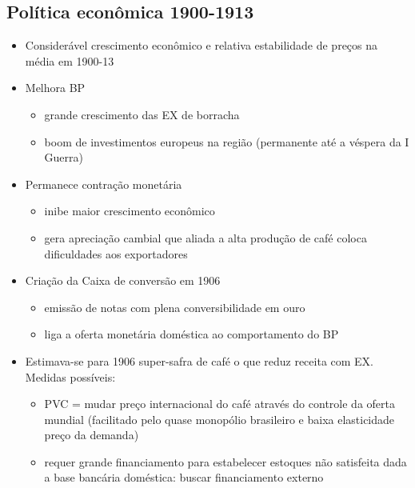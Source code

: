 \documentclass[a4paper,12pt]{article}[abntex2]
\begin{document}
\subsection{\textbf{Política econômica 1900-1913}}
\begin{itemize}
    \item Considerável crescimento econômico e relativa estabilidade de preços na média em 1900-13
    \item Melhora BP
    \begin{itemize}
        \item  grande crescimento das EX de borracha
    \end{itemize}
    \begin{itemize}
        \item boom de investimentos europeus na região (permanente até a véspera da I Guerra)
    \end{itemize}
    \item Permanece contração monetária
    \begin{itemize}
        \item inibe maior crescimento econômico
    \end{itemize}
    \begin{itemize}
        \item gera apreciação cambial que aliada a alta produção de café coloca dificuldades aos exportadores
    \end{itemize}
\item Criação da Caixa de conversão em 1906
\begin{itemize}
    \item  emissão de notas com plena conversibilidade em ouro
\end{itemize}
\begin{itemize}
    \item liga a oferta monetária doméstica ao comportamento do BP
\end{itemize}
\item Estimava-se para 1906 super-safra de café o que reduz receita com EX. Medidas possíveis:
\begin{itemize}
    \item PVC = mudar preço internacional do café através do controle da oferta mundial (facilitado pelo quase monopólio brasileiro e baixa elasticidade preço da demanda)
\end{itemize}
\begin{itemize}
    \item requer grande financiamento para estabelecer estoques não satisfeita dada a base bancária doméstica: buscar financiamento externo

\end{itemize}
\end{itemize}
\end{document}
